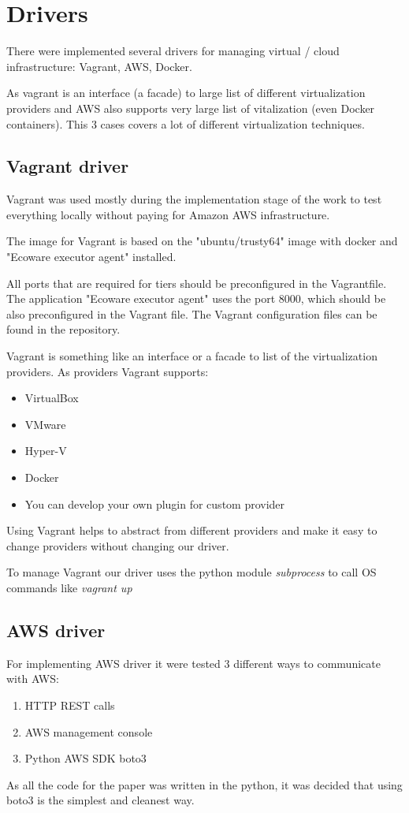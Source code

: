 \section{Drivers}
There were implemented several drivers for managing virtual / cloud infrastructure: Vagrant, AWS, Docker.

As vagrant is an interface (a facade) to large list of different virtualization providers and AWS also supports very large list of vitalization (even Docker containers). This 3 cases covers a lot of different virtualization techniques.

\subsection{Vagrant driver}
Vagrant was used mostly during the implementation stage of the work to test everything locally without paying for Amazon AWS infrastructure.

The image for Vagrant is based on the "ubuntu/trusty64" image with docker and "Ecoware executor agent" installed.

All ports that are required for tiers should be preconfigured in the Vagrantfile. The application "Ecoware executor agent" uses the port 8000, which should be also preconfigured in the Vagrant file. The Vagrant configuration files can be found in the repository.

Vagrant is something like an interface or a facade to list of the virtualization providers. As providers Vagrant supports:
\begin{itemize}
    \item VirtualBox
    \item VMware
    \item Hyper-V
    \item Docker
    \item You can develop your own plugin for custom provider
\end{itemize}
Using Vagrant helps to abstract from different providers and make it easy to change providers without changing our driver.

To manage Vagrant our driver uses the python module \textit{subprocess} to call OS commands like \textit{vagrant up}

\subsection{AWS driver}
For implementing AWS driver it were tested 3 different ways to communicate with AWS:
\begin{enumerate}
    \item HTTP REST calls
    \item AWS management console
    \item Python AWS SDK boto3
\end{enumerate}
As all the code for the paper was written in the python, it was decided that using boto3 is the simplest and cleanest way.

